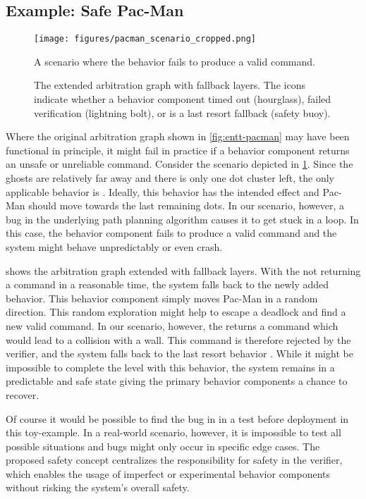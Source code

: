 \subsection{Example: Safe Pac-Man}

\begin{figure}
    \centering
    \texttt{[image: figures/pacman\_scenario\_cropped.png]}
    \caption{A scenario where the  behavior fails to produce a valid command.}
    \label{fig:pacman-scenario}
\end{figure}

\begin{figure}
    \centering
    
    \caption{The extended arbitration graph with fallback layers. The icons indicate whether a behavior component
        timed out (hourglass),
        failed verification (lightning bolt),
        or is a last resort fallback (safety buoy).}
    \label{fig:pacman-arbitrator-safe}
\end{figure}

Where the original arbitration graph shown in \cref{fig:entt-pacman} may have been functional in principle, it might fail in practice if a behavior component returns an unsafe or unreliable command.
Consider the scenario depicted in \cref{fig:pacman-scenario}.
Since the ghosts are relatively far away and there is only one dot cluster left, the only applicable behavior is .
Ideally, this behavior has the intended effect and Pac-Man should move towards the last remaining dots.
In our scenario, however, a bug in the underlying path planning algorithm causes it to get stuck in a loop.
In this case, the behavior component fails to produce a valid command and the system might behave unpredictably or even crash.

 shows the arbitration graph extended with fallback layers.
With the  not returning a command in a reasonable time, the system falls back to the newly added  behavior.
This behavior component simply moves Pac-Man in a random direction.
This random exploration might help to escape a deadlock and find a new valid command.
In our scenario, however, the  returns a command which would lead to a collision with a wall.
This command is therefore rejected by the verifier, and the system falls back to the last resort behavior .
While it might be impossible to complete the level with this behavior, the system remains in a predictable and safe state giving the primary behavior components a chance to recover.

Of course it would be possible to find the bug in  in a test before deployment in this toy-example.
In a real-world scenario, however, it is impossible to test all possible situations and bugs might only occur in specific edge cases.
The proposed safety concept centralizes the responsibility for safety in the verifier, which enables the usage of imperfect or experimental behavior components without risking the system's overall safety.

